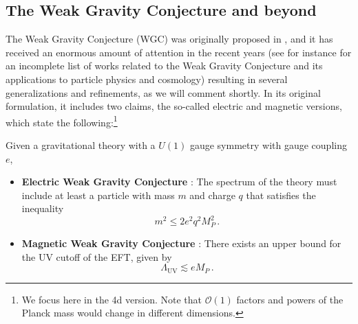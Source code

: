 \documentclass[11pt,a4paper]{article}
\begin{document}
\subsection{The Weak Gravity Conjecture and beyond}


The Weak Gravity Conjecture (WGC) was originally  proposed in \cite{ArkaniHamed:2006dz}, and it has received an enormous amount of attention in the recent years (see for instance \cite{Brown:2015iha,Rudelius:2015xta,Heidenreich:2015nta, Heidenreich:2015wga,Ibanez:2015fcv,Marsh:2015xka,Hebecker:2015zss, Heidenreich:2016aqi, Montero:2016tif,Saraswat:2016eaz,McAllister:2016vzi,Brandenberger:2016vhg,Palti:2017elp,Montero:2017mdq,Ibanez:2017vfl, Aldazabal:2018nsj,Lee:2018urn,Lee:2018spm, Andriolo:2018lvp,Cheung:2018cwt,Heidenreich:2019zkl,Lee:2019tst, Gonzalo:2019gjp,Benakli:2020pkm,Benakli:2020vng, Buratti:2020kda, Gonzalo:2020kke} for an incomplete list of  works related to the Weak Gravity Conjecture and its applications to particle physics and cosmology) resulting in several generalizations and refinements, as we will comment shortly. In its original formulation, it includes two claims, the so-called electric and magnetic versions, which state the following:\footnote{We focus here in the 4d version. Note that $\mathcal{O}(1)$ factors and powers of the Planck mass would change in different dimensions.}
\vspace{0.2cm}
\begin{tcolorbox}[colback=boxblue]
Given a gravitational theory with a $U(1)$ gauge symmetry with gauge coupling $e$, 
\begin{itemize}
\item[]{\textbf{Electric Weak Gravity Conjecture} \cite{ArkaniHamed:2006dz}: The spectrum of the theory must include at least a particle with mass $m$ and charge $q$ that satisfies the inequality 
\begin{equation}
\label{eq:EWGC}
m^2 \leq 2 e^2 q^2 M_{P}^2\, .
\end{equation}}
\item[]{\textbf{Magnetic Weak Gravity Conjecture} \cite{ArkaniHamed:2006dz}: There exists an upper bound for the UV cutoff of the EFT, given by
\begin{equation}
\label{eq:MagWGC}
\Lambda_{\mathrm{UV}} \lesssim e M_P\, .
\end{equation}
}
\end{itemize}
\end{tcolorbox}
\end{document}
